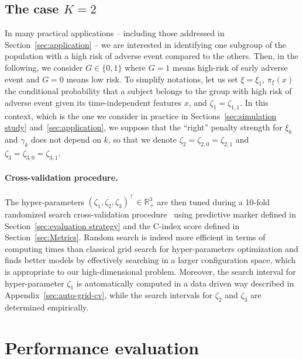 \documentclass[11pt]{article}
\newcommand{\R}{\mathds R}
\begin{document}
\subsection{The case $K=2$}
\label{sec:K=2}

In many practical applications -- including those addressed in Section~\ref{sec:application} -- we are interested in identifying one subgroup of the population with a high risk of adverse event compared to the others. Then, in the following, we consider $G \in \{ 0, 1\}$ where $G=1$ means high-risk of early adverse event and $G=0$ means low risk.
To simplify notations, let us set $\xi = \xi_1$, $\pi_\xi(x)$ the conditional probability that a subject belongs to the group with high risk of adverse event given its time-independent features $x$, and $\zeta_1 = \zeta_{1,1}$.
In this context, which is the one we consider in practice in Sections~\ref{sec:simulation study} and~\ref{sec:application}, we suppose that the ``right'' penalty strength for $\xi_k$ and $\gamma_k$ does not depend on $k$, so that we denote $\zeta_2 = \zeta_{2,0} = \zeta_{2,1}$ and $\zeta_3 = \zeta_{3,0} = \zeta_{3,1}$. 

\paragraph{Cross-validation procedure.}

The hyper-parameters $(\zeta_1, \zeta_2, \zeta_3)^\top \in \R_+^3$ are then tuned during a 10-fold randomized search cross-validation procedure~\citep{bergstra2012random} using predictive marker defined in Section~\ref{sec:evaluation strategy} and the C-index score defined in Section~\ref{sec:Metrics}.
Random search is indeed more efficient in terms of computing times than classical grid search for hyper-parameters optimization and finds better models by effectively searching in a larger configuration space, which is appropriate to our high-dimensional problem. Moreover, the search interval for hyper-parameter $\zeta_1$ is automatically computed in a data driven way described in Appendix~\ref{sec:auto-grid-cv}, while the search intervals for $\zeta_2$ and $\zeta_3$ are determined empirically.


\section{Performance evaluation}
\label{sec:Performance evaluation}
\end{document}
